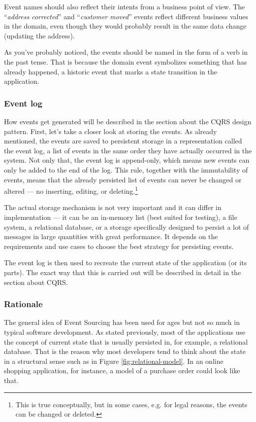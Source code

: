 \documentclass{book}
\begin{document}
Event names should also reflect their intents from a business point of
view. The ``\emph{address corrected}'' and ``\emph{customer moved}''
events reflect different business values in the domain, even though they
would probably result in the same data change (updating the address).

As you've probably noticed, the events should be named in the form of a
verb in the past tense. That is because the domain event symbolizes
something that has already happened, a historic event that marks a state
transition in the application.

\subsubsection{Event log}\label{event-log}

How events get generated will be described in the section about the CQRS
design pattern. First, let's take a closer look at storing the events.
As already mentioned, the events are saved to persistent storage in a
representation called the event log, a list of events in the same order
they have actually occurred in the system. Not only that, the event log
is append-only, which means new events can only be added to the end of
the log. This rule, together with the immutability of events, means that
the already persisted list of events can never be changed or altered ---
no inserting, editing, or
deleting.\footnote{This is true conceptually, but in some cases, e.g. for legal reasons, the events can be changed or deleted.\cite{greg-youtube}}

The actual storage mechanism is not very important and it can differ in
implementation --- it can be an in-memory list (best suited for
testing), a file system, a relational database, or a storage
specifically designed to persist a lot of messages in large quantities
with great performance. It depends on the requirements and use cases to
choose the best strategy for persisting events.

The event log is then used to recreate the current state of the
application (or its parts). The exact way that this is carried out will
be described in detail in the section about CQRS.

\subsubsection{Rationale}\label{rationale}

The general idea of Event Sourcing has been used for ages but not so
much in typical software development. As stated previously, most of the
applications use the concept of current state that is usually persisted
in, for example, a relational database. That is the reason why most
developers tend to think about the state in a structural sense such as
in Figure \ref{fig:relational-model}. In an online shopping application,
for instance, a model of a purchase order could look like that.
\end{document}
